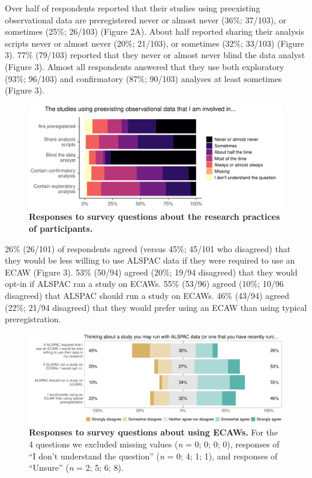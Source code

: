 \documentclass[
  man,floatsintext]{apa6}
\begin{document}
Over half of respondents reported that their studies using preexisting observational data are preregistered never or almost never (36\%; 37/103), or sometimes (25\%; 26/103) (Figure 2A). About half reported sharing their analysis scripts never or almost never (20\%; 21/103), or sometimes (32\%; 33/103) (Figure 3). 77\% (79/103) reported that they never or almost never blind the data analyst (Figure 3). Almost all respondents answered that they use both exploratory (93\%; 96/103) and confirmatory (87\%; 90/103) analyses at least sometimes (Figure 3).

\begin{figure}

{\centering \includegraphics[width=1\linewidth]{figs/methodPlot-1} 

}

\caption{\textbf{Responses to survey questions about the research practices of participants.}}\label{fig:methodPlot}
\end{figure}



26\% (26/101) of respondents agreed (versus 45\%; 45/101 who disagreed) that they would be less willing to use ALSPAC data if they were required to use an ECAW (Figure 3). 53\% (50/94) agreed (20\%; 19/94 disagreed) that they would opt-in if ALSPAC ran a study on ECAWs. 55\% (53/96) agreed (10\%; 10/96 disagreed) that ALSPAC should run a study on ECAWs. 46\% (43/94) agreed (22\%; 21/94 disagreed) that they would prefer using an ECAW than using typical preregistration.

\begin{figure}

{\centering \includegraphics[width=1\linewidth]{figs/alspacPlot-1} 

}

\caption{\textbf{Responses to survey questions about using ECAWs.} For the 4 questions we excluded missing values (\emph{n} = 0; 0; 0; 0), responses of ``I don't understand the question'' (\emph{n} = 0; 4; 1; 1), and responses of ``Unsure'' (\emph{n} = 2; 5; 6; 8).}\label{fig:alspacPlot}
\end{figure}
\end{document}

